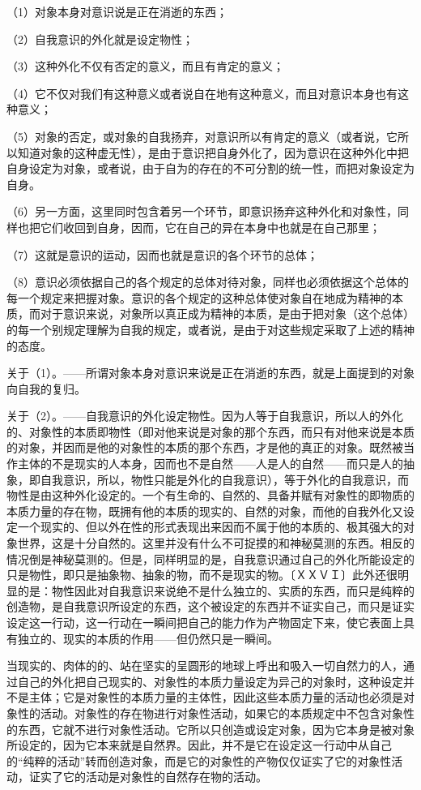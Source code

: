 \documentclass[a4paper,twoside,12pt,AutoFakeBold]{ctexart}
\begin{document}
（1）对象本身对意识说是正在消逝的东西；

（2）自我意识的外化就是设定物性；

（3）这种外化不仅有否定的意义，而且有肯定的意义；

（4）它不仅对我们有这种意义或者说自在地有这种意义，而且对意识本身也有这种意义；

（5）对象的否定，或对象的自我扬弃，对意识所以有肯定的意义（或者说，它所以知道对象的这种虚无性），是由于意识把自身外化了，因为意识在这种外化中把自身设定为对象，或者说，由于自为的存在的不可分割的统一性，而把对象设定为自身。

（6）另一方面，这里同时包含着另一个环节，即意识扬弃这种外化和对象性，同样也把它们收回到自身，因而，它在自己的异在本身中也就是在自己那里；

（7）这就是意识的运动，因而也就是意识的各个环节的总体；

（8）意识必须依据自己的各个规定的总体对待对象，同样也必须依据这个总体的每一个规定来把握对象。意识的各个规定的这种总体使对象自在地成为精神的本质，而对于意识来说，对象所以真正成为精神的本质，是由于把对象（这个总体）的每一个别规定理解为自我的规定，或者说，是由于对这些规定采取了上述的精神的态度。

关于（1）。——所谓对象本身对意识来说是正在消逝的东西，就是上面提到的对象向自我的复归。

关于（2）。——自我意识的外化设定物性。因为人等于自我意识，所以人的外化的、对象性的本质即物性（即对他来说是对象的那个东西，而只有对他来说是本质的对象，并因而是他的对象性的本质的那个东西，才是他的真正的对象。既然被当作主体的不是现实的人本身，因而也不是自然——人是人的自然——而只是人的抽象，即自我意识，所以，物性只能是外化的自我意识），等于外化的自我意识，而物性是由这种外化设定的。一个有生命的、自然的、具备并赋有对象性的即物质的本质力量的存在物，既拥有他的本质的现实的、自然的对象，而他的自我外化又设定一个现实的、但以外在性的形式表现出来因而不属于他的本质的、极其强大的对象世界，这是十分自然的。这里并没有什么不可捉摸的和神秘莫测的东西。相反的情况倒是神秘莫测的。但是，同样明显的是，自我意识通过自己的外化所能设定的只是物性，即只是抽象物、抽象的物，而不是现实的物。〔ＸＸＶＩ〕此外还很明显的是：物性因此对自我意识来说绝不是什么独立的、实质的东西，而只是纯粹的创造物，是自我意识所设定的东西，这个被设定的东西并不证实自己，而只是证实设定这一行动，这一行动在一瞬间把自己的能力作为产物固定下来，使它表面上具有独立的、现实的本质的作用——但仍然只是一瞬间。

当现实的、肉体的的、站在坚实的呈圆形的地球上呼出和吸入一切自然力的人，通过自己的外化把自己现实的、对象性的本质力量设定为异己的对象时，这种设定并不是主体；它是对象性的本质力量的主体性，因此这些本质力量的活动也必须是对象性的活动。对象性的存在物进行对象性活动，如果它的本质规定中不包含对象性的东西，它就不进行对象性活动。它所以只创造或设定对象，因为它本身是被对象所设定的，因为它本来就是自然界。因此，并不是它在设定这一行动中从自己的“纯粹的活动”转而创造对象，而是它的对象性的产物仅仅证实了它的对象性活动，证实了它的活动是对象性的自然存在物的活动。
\end{document}
